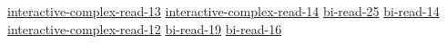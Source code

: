 \hyperref[sec:interactive-complex-read-13]{interactive-complex-read-13}
\hyperref[sec:interactive-complex-read-14]{interactive-complex-read-14}
\hyperref[sec:bi-read-25]{bi-read-25}
\hyperref[sec:bi-read-14]{bi-read-14}
\hyperref[sec:interactive-complex-read-12]{interactive-complex-read-12}
\hyperref[sec:bi-read-19]{bi-read-19}
\hyperref[sec:bi-read-16]{bi-read-16}
